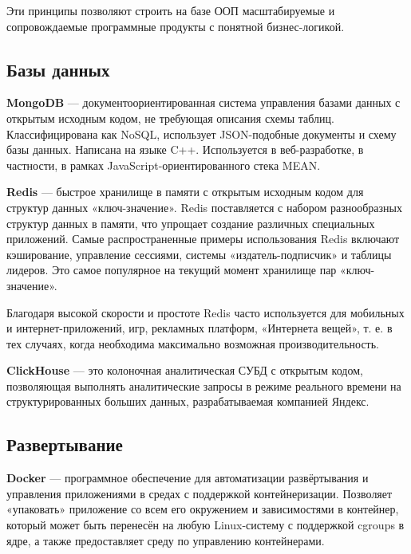 \documentclass[specification,annotation,times]{itmo-student-thesis}
\begin{document}
Эти принципы позволяют строить на базе ООП масштабируемые и сопровождаемые программные продукты с понятной бизнес-логикой.

\subsection{Базы данных}

\textbf{MongoDB} \label{mongodb} — документоориентированная система управления базами данных с открытым исходным кодом, не требующая описания схемы таблиц. Классифицирована как NoSQL, использует JSON-подобные документы и схему базы данных. Написана на языке C++. Используется в веб-разработке, в частности, в рамках JavaScript-ориентированного стека MEAN.

\textbf{Redis} \label{redis} — быстрое хранилище в памяти с открытым исходным кодом для структур данных «ключ-значение». Redis поставляется с набором разнообразных структур данных в памяти, что упрощает создание различных специальных приложений. Самые распространенные примеры использования Redis включают кэширование, управление сессиями, системы «издатель-подписчик» и таблицы лидеров. Это самое популярное на текущий момент хранилище пар «ключ-значение».

Благодаря высокой скорости и простоте Redis часто используется для мобильных и интернет-приложений, игр, рекламных платформ, «Интернета вещей», т. е. в тех случаях, когда необходима максимально возможная производительность.

\textbf{ClickHouse} \label{clickhouse} — это колоночная аналитическая СУБД с открытым кодом, позволяющая выполнять аналитические запросы в режиме реального времени на структурированных больших данных, разрабатываемая компанией Яндекс.





\subsection{Развертывание}

\textbf{Docker}\label{docker} — программное обеспечение для автоматизации развёртывания и управления приложениями в средах с поддержкой контейнеризации. Позволяет «упаковать» приложение со всем его окружением и зависимостями в контейнер, который может быть перенесён на любую Linux-систему с поддержкой cgroups в ядре, а также предоставляет среду по управлению контейнерами.
\end{document}
